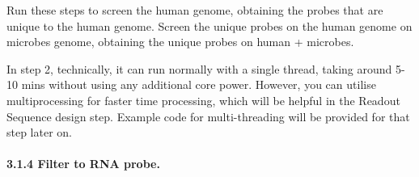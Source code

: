 \documentclass[
]{article}
\begin{document}
Run these steps to screen the human genome, obtaining the probes that
are unique to the human genome. Screen the unique probes on the human
genome on microbes genome, obtaining the unique probes on human +
microbes.

In step 2, technically, it can run normally with a single thread, taking
around 5-10 mins without using any additional core power. However, you
can utilise multiprocessing for faster time processing, which will be
helpful in the Readout Sequence design step. Example code for
multi-threading will be provided for that step later on.

\paragraph{3.1.4 Filter to RNA probe.}\label{filter-to-rna-probe.}
\end{document}
